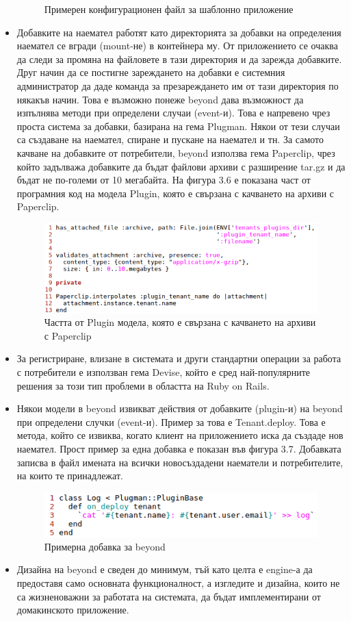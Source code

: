 \documentclass[pdftex,14pt,a4paper]{extreport}
\begin{document}
\begin{itemize}
\begin{figure}[h]
    \caption{Примерен конфигурационен файл за шаблонно приложение}
  \end{figure}
\item Добавките на наемател работят като директорията за добавки на определения наемател се вгради (mount-не) в контейнера му. От приложението се очаква да следи за промяна на файловете в тази директория и да зарежда добавките. Друг начин да се постигне зареждането на добавки е системния администратор да даде команда за презареждането им от тази директория по някакъв начин. Това е възможно понеже beyond дава възможност да изпълнява методи при определени случаи (event-и). Това е напревено чрез проста система за добавки, базирана на гема Plugman. Някои от тези случаи са създаване на наемател, спиране и пускане на наемател и тн. За самото качване на добавките от потребители, beyond използва гема Paperclip, чрез който задълважа добавките да бъдат файлови архиви с разширение tar.gz и да бъдат не по-големи от 10 мегабайта. На фигура 3.6 е показана част от програмния код на модела Plugin, която е свързана с качването на архиви с Paperclip.
  \begin{figure}[h]
    \centering
    \includegraphics[scale=0.8]{./snippets/plugin_archive}
    \caption{Частта от Plugin модела, която е свързана с качването на архиви с Paperclip}
  \end{figure}
  \item За регистриране, влизане в системата и други стандартни операции за работа с потребители е използван гема Devise, който е сред най-популярните решения за този тип проблеми в областта на Ruby on Rails.
  \item Някои модели в beyond извикват действия от добавките (plugin-и) на beyond при определени случки (event-и). Пример за това е Tenant.deploy. Това е метода, който се извиква, когато клиент на приложението иска да създаде нов наемател. Прост пример за една добавка е показан във фигура 3.7. Добавката записва в файл имената на всички новосъздадени наематели и потребителите, на които те принадлежат.
  \begin{figure}[h]
    \centering
    \includegraphics[scale=0.8]{./snippets/beyond_plugin}
    \caption{Примерна добавка за beyond}
  \end{figure}
  \item Дизайна на beyond е сведен до минимум, тъй като целта е engine-а да предоставя само основната функционалност, а изгледите и дизайна, които не са жизненоважни за работата на системата, да бъдат имплементирани от домакинското приложение.
\end{itemize}
\end{document}
